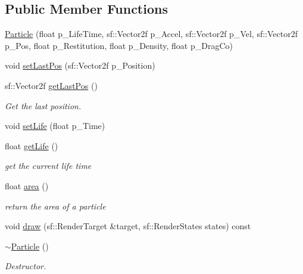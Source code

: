 \subsection*{Public Member Functions}
\begin{DoxyCompactItemize}
\item 
\hyperlink{class_particle_ac4b406b1462a981e7a0e430b7592e049}{Particle} (float p\+\_\+\+Life\+Time, sf\+::\+Vector2f p\+\_\+\+Accel, sf\+::\+Vector2f p\+\_\+\+Vel, sf\+::\+Vector2f p\+\_\+\+Pos, float p\+\_\+\+Restitution, float p\+\_\+\+Density, float p\+\_\+\+Drag\+Co)
\item 
void \hyperlink{class_particle_a5a10e04871f4948c80820c79121e28a5}{set\+Last\+Pos} (sf\+::\+Vector2f p\+\_\+\+Position)
\item 
\mbox{\label{class_particle_a637683e83cbdf74ea92e8f01653e9156}} 
sf\+::\+Vector2f \hyperlink{class_particle_a637683e83cbdf74ea92e8f01653e9156}{get\+Last\+Pos} ()
\begin{DoxyCompactList}\small\item\em Get the last position. \end{DoxyCompactList}\item 
void \hyperlink{class_particle_a5a7e1ab519e58d9599cb6de75502f60f}{set\+Life} (float p\+\_\+\+Time)
\item 
\mbox{\label{class_particle_a59bbb8b7047dfa0c22fcdc37999fb278}} 
float \hyperlink{class_particle_a59bbb8b7047dfa0c22fcdc37999fb278}{get\+Life} ()
\begin{DoxyCompactList}\small\item\em get the current life time \end{DoxyCompactList}\item 
\mbox{\label{class_particle_a979da9e9c175ca4915aa2e074e844d6d}} 
float \hyperlink{class_particle_a979da9e9c175ca4915aa2e074e844d6d}{area} ()
\begin{DoxyCompactList}\small\item\em return the area of a particle \end{DoxyCompactList}\item 
void \hyperlink{class_particle_a57316a997dbf6b060ec989c059ba9616}{draw} (sf\+::\+Render\+Target \&target, sf\+::\+Render\+States states) const
\item 
\mbox{\label{class_particle_ad030d0fe7b88cf81744b127c99244ff4}} 
\hyperlink{class_particle_ad030d0fe7b88cf81744b127c99244ff4}{$\sim$\+Particle} ()
\begin{DoxyCompactList}\small\item\em Destructor. \end{DoxyCompactList}\end{DoxyCompactItemize}
